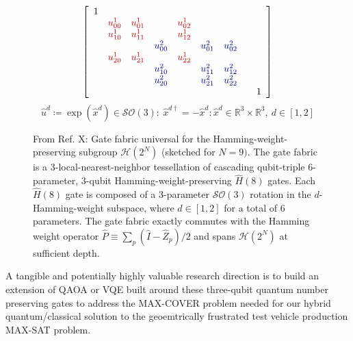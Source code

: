 \documentclass[aps,pra,twocolumn,superscriptaddress,groupedaddress]{revtex4}  %
\begin{document}
\begin{figure}
\begin{equation*}
\left [
\begin{array}{rrrrrrrrr}
1 & & & & & & & & \\
 & \color{brickred}{u_{00}^{1}} & \color{brickred}{u_{01}^{1}} & &
\color{brickred}{u_{02}^{1}} & & & & \\
 & \color{brickred}{u_{10}^{1}} & \color{brickred}{u_{11}^{1}} & &
\color{brickred}{u_{12}^{1}} & & & & \\
 & & & \color{darkblue}{u_{00}^{2}} & & \color{darkblue}{u_{01}^{2}} &
\color{darkblue}{u_{02}^{2}} & \\
 & \color{brickred}{u_{20}^{1}} & \color{brickred}{u_{21}^{1}} & &
\color{brickred}{u_{22}^{1}} & & & & \\
 & & & \color{darkblue}{u_{10}^{2}} & & \color{darkblue}{u_{11}^{2}} &
\color{darkblue}{u_{12}^{2}} & \\
 & & & \color{darkblue}{u_{20}^{2}} & & \color{darkblue}{u_{21}^{2}} &
\color{darkblue}{u_{22}^{2}} & \\
& & & & & & & & 1 \\
\end{array}
\right ]
\end{equation*}
\begin{equation*}
\hat u^{d}
\coloneqq
\exp(\hat x^{d})
\in 
\mathcal{SO}(3)
:
\
\hat x^{d\dagger}
=
-
\hat x^{d}
:
\hat x^{d}
\in
\mathbb{R}^3
\times
\mathbb{R}^3
, 
\
d \in [1, 2]
\end{equation*}
\caption{From Ref. X: Gate fabric  universal for the Hamming-weight-preserving subgroup
$\mathcal{H}(2^N)$ (sketched for $N=9)$.  The gate fabric is a
3-local-nearest-neighbor tessellation of cascading qubit-triple 6-parameter,
3-qubit Hamming-weight-preserving $\hat H(8)$ gates. Each $\hat H(8)$ gate is
composed of a 3-parameter $\mathcal{SO}(3)$ rotation in the $d$-Hamming-weight
subspace, where $d \in [1, 2]$ for a total of 6 parameters. The gate fabric exactly
commutes with the Hamming weight operator $\hat P \equiv \sum_{p} (\hat I - \hat
Z_p) / 2$ and spans $\mathcal{H}(2^N)$ at sufficient depth.
}
\label{fig:H2}
\end{figure}

A tangible and potentially highly valuable research direction is to build an
extension of QAOA or VQE built around these three-qubit quantum number
preserving gates to address the MAX-COVER problem needed for our hybrid
quantum/classical solution to the geoemtrically frustrated test vehicle
production MAX-SAT problem. 

\appendix
\newpage
\clearpage
\end{document}
